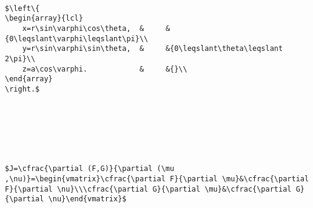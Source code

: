 

\centerline{}

~\\


~\\

\noindent \setlength\sdim{10pt}

~\\

\begin{lstlisting}
$\left\{
\begin{array}{lcl}
	x=r\sin\varphi\cos\theta,  &     &{0\leqslant\varphi\leqslant\pi}\\
	y=r\sin\varphi\sin\theta,  &     &{0\leqslant\theta\leqslant 2\pi}\\
	z=a\cos\varphi.            &     &{}\\
\end{array}
\right.$
\end{lstlisting}

~\\


~\\

\noindent \setlength\sdim{10pt}

~\\

\begin{lstlisting}
$J=\cfrac{\partial (F,G)}{\partial (\mu ,\nu)}=\begin{vmatrix}\cfrac{\partial F}{\partial \mu}&\cfrac{\partial F}{\partial \nu}\\\cfrac{\partial G}{\partial \mu}&\cfrac{\partial G}{\partial \nu}\end{vmatrix}$
\end{lstlisting}

